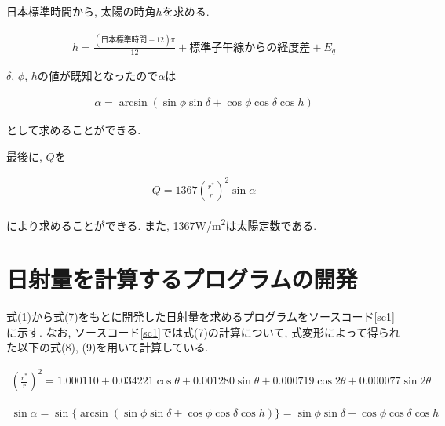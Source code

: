 \documentclass[a4j,12pt,]{jarticle}
\begin{document}
日本標準時間から, 太陽の時角$h$を求める.

\begin{eqnarray}
  h = \frac{(日本標準時間-12)\pi}{12}+標準子午線からの経度差+E_q
\end{eqnarray}

$\delta$, $\phi$, $h$の値が既知となったので$\alpha$は

\begin{eqnarray}
  \alpha = \arcsin (\sin \phi\sin \delta+\cos \phi\cos \delta\cos h)
\end{eqnarray}

として求めることができる.

最後に, $Q$を

\begin{eqnarray}
  Q = 1367(\frac{r^{*}}{r})^{2}\sin \alpha
\end{eqnarray}

により求めることができる.
また, 1367\si{\watt}/\si{\metre\squared}は太陽定数である.

\section{日射量を計算するプログラムの開発}
式(1)から式(7)をもとに開発した日射量を求めるプログラムをソースコード\ref{sc1}に示す.
なお, ソースコード\ref{sc1}では式(7)の計算について, 式変形によって得られた以下の式(8), (9)を用いて計算している.

\begin{eqnarray}
  (\frac{r^{*}}{r})^{2} = 1.000110+0.034221\cos \theta+0.001280\sin \theta+0.000719\cos 2\theta+0.000077\sin 2\theta
\end{eqnarray}

\begin{eqnarray}
  \sin \alpha = \sin \{\arcsin (\sin \phi\sin \delta+\cos \phi\cos \delta\cos h)\} = \sin \phi\sin \delta+\cos \phi\cos \delta\cos h
\end{eqnarray}
\end{document}
